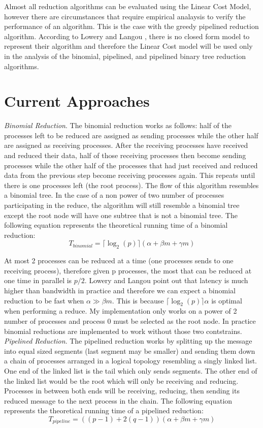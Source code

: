 \documentclass{article}
\begin{document}
Almost all reduction algorithms can be evaluated using the Linear Cost Model, however there are
circumstances that require empirical analaysis to verify the performance of an algorithm. This is
the case with the greedy pipelined reduction algorithm. According to Lowery and Langou \cite{Lowery-13},
there is no closed form model to represent their algorithm and therefore the Linear Cost model will
be used only in the analysis of the binomial, pipelined, and pipelined binary tree reduction 
algorithms.

\section{Current Approaches}

\textit{Binomial Reduction}. The binomial reduction works as follows: half of the processes left to be
reduced are assigned as sending processes while the other half are assigned as receiving processes. After
the receiving processes have received and reduced their data, half of those receiving processes then
become sending processes while the other half of the processes that had just received and reduced data
from the previous step become receiving processes again. This repeats until there is one processes left (the
root process). The flow of this algorithm resembles a binomial tree. In the case of a non power of two
number of processes participating in the reduce, the algorithm will still resemble a binomial tree except
the root node will have one subtree that is not a binomial tree. The following equation represents the
theoretical running time of a binomial reduction:
$$T_{binomial} = \lceil \log_2(p) \rceil (\alpha + \beta m + \gamma m)$$

\noindent At most 2 processes can be reduced at a time (one processes sends to one receiving process), therefore
given p processes, the most that can be reduced at one time in parallel is $p/2$. Lowery and Langou 
\cite{Lowery-13} point out that latency is much higher than bandwidth in practice and therefore we can
expect a binomial reduction to be fast when $\alpha \gg \beta m$. This is because $\lceil \log_2(p) \rceil
\alpha$ is optimal when performing a reduce. My implementation only works on a power of 2 number of 
processes and process 0 must be selected as the root node. In practice binomial reductions are implemented
to work without those two contstrains. \\

\textit{Pipelined Reduction}. The pipelined reduction works by splitting up the message into equal sized
segments (last segment may be smaller) and sending them down a chain of processes arranged in a logical
topology resembling a singly linked list. One end of the linked list is the tail which only sends segments.
The other end of the linked list would be the root which will only be receiving and reducing. Processes in
between both ends will be receiving, reducing, then sending its reduced message to the next process in the
chain. The following equation represents the theoretical running time of a pipelined reduction:
$$T_{pipeline} = ((p-1) + 2(q-1))(\alpha + \beta m + \gamma m)$$
\end{document}
